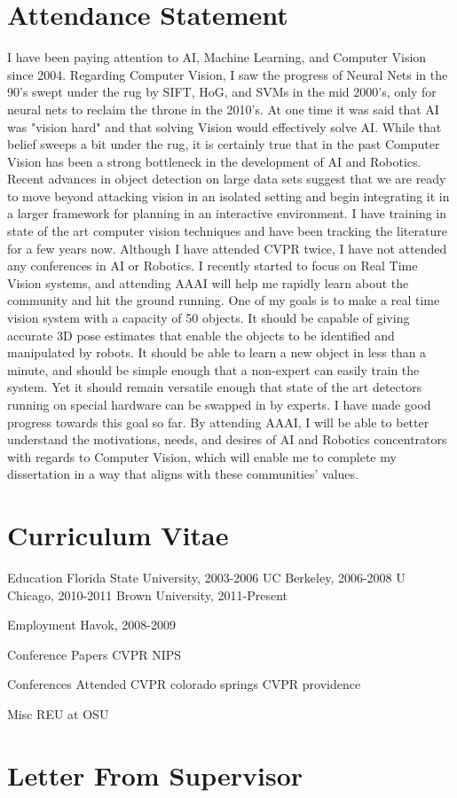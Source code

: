 \documentclass[12pt]{article}
\numberwithin{equation}{section}
\numberwithin{table}{section}
\numberwithin{figure}{section}
\begin{document}
\newpage

\section{Attendance Statement}
  I have been paying attention to AI, Machine Learning, and Computer Vision since 2004. 
Regarding Computer Vision, I saw the progress of Neural Nets in the 90's swept under 
the rug by SIFT, HoG, and SVMs in the mid 2000's, only for neural nets to reclaim the throne in the 2010's.
At one time it was said that AI was "vision hard" and that solving Vision would
effectively solve AI. While that belief sweeps a bit under the rug, it is certainly true
that in the past Computer Vision has been a strong bottleneck in the development of AI and 
Robotics. 
  Recent advances in object detection on large data sets suggest that we are ready
to move beyond attacking vision in an isolated setting and begin integrating it in a
larger framework for planning in an interactive environment. I have training in state
of the art computer vision techniques and have been tracking the literature for a few
years now. Although I have attended CVPR twice, I have not attended any conferences in
AI or Robotics.  I recently started to focus on Real Time Vision systems, and attending AAAI
will help me rapidly learn about the community and hit the ground running.
  One of my goals is to make a real time vision system with a capacity of 50 objects. It should be
capable of giving accurate 3D pose estimates that enable the objects to be identified and manipulated
by robots. It should be able to learn a new object in less than a minute, and should be simple enough
that a non-expert can easily train the system. Yet it should remain versatile enough that state of
the art detectors running on special hardware can be swapped in by experts.
  I have made good progress towards this goal so far. By attending AAAI, I will be able to
better understand the motivations, needs, and desires of AI and Robotics concentrators with regards
to Computer Vision, which will enable me to complete my dissertation in a way that aligns with
these communities' values.

\newpage

\section{Curriculum Vitae}
Education
Florida State University, 2003-2006
UC Berkeley, 2006-2008
U Chicago, 2010-2011
Brown University, 2011-Present

Employment
Havok, 2008-2009

Conference Papers
CVPR
NIPS

Conferences Attended
CVPR colorado springs
CVPR providence

Misc
REU at OSU


\newpage

\section{Letter From Supervisor}

\newpage
\end{document}
